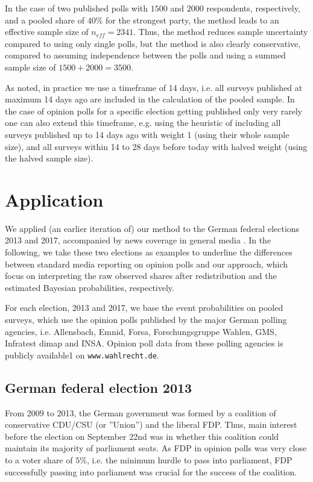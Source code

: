 \documentclass[smallcondensed]{svjour3}     %
\begin{document}
In the case of two published polls with $1500$ and $2000$ respondents, respectively, and a pooled share of $40\%$
for the strongest party, the method leads
to an effective sample size of $n_{eff} = 2341$. Thus, the method reduces sample uncertainty
compared to using only single polls, but the method is also clearly conservative, compared to
assuming independence between the polls and using a summed sample size of $1500 + 2000 = 3500$.

As noted, in practice we use a timeframe of 14 days, i.e. all surveys published at maximum 14 days ago are included
in the calculation of the pooled sample. In the case of opinion polls for a specific election getting published
only very rarely one can also extend this timeframe, e.g. using the heuristic of including all surveys published up to 14 days
ago with weight 1 (using their whole sample size), and all surveys within 14 to 28 days before today with halved weight
(using the halved sample size).



\section{Application} \label{sec:application}
We applied (an earlier iteration of) our method to the German federal elections
2013 and 2017, accompanied by news coverage in general media \citep[cf.][]{wahlistik_2013, gelitz_2017}.
In the following, we take these two elections as examples to underline
the differences between standard media reporting on opinion polls and our approach,
which focus on interpreting the raw observed shares after redistribution and
the estimated Bayesian probabilities, respectively.

For each election, 2013 and 2017, we base the event probabilities on
pooled surveys, which use the opinion polls published by the major
German polling agencies, i.e. Allensbach, Emnid, Forsa, Forschungsgruppe Wahlen,
GMS, Infratest dimap and INSA.
Opinion poll data from these polling agencies is publicly available1
on \texttt{www.wahlrecht.de}. 


\subsection{German federal election 2013} \label{subsec:2013}
From 2009 to 2013, the German government was formed by a coalition of 
conservative CDU/CSU (or ''Union'') and the liberal FDP. 
Thus, main interest before the election on September 22nd was in whether this
coalition could maintain its majority of parliament seats. As FDP in opinion
polls was very close to a voter share of $5\%$, i.e. the minimum hurdle to
pass into parliament, FDP successfully passing into parliament was crucial
for the success of the coalition.
\end{document}
